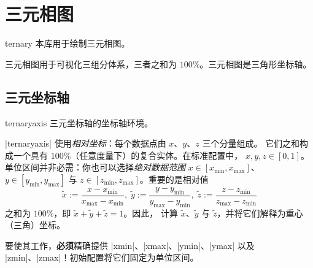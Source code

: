 
\section{三元相图}
\begingroup
\def\pgfplotsmanualcurlibrary{ternary}

\begin{pgfplotslibrary}{ternary}
    本库用于绘制三元相图。

    三元相图用于可视化三组分体系，三者之和为 $100\%$。三元相图是三角形坐标轴。
\end{pgfplotslibrary}


\subsection{三元坐标轴}

\begin{environment}{{ternaryaxis}}
    三元坐标轴的坐标轴环境。
\begin{codeexample}[]
\end{codeexample}

    |ternaryaxis| 使用\emph{相对坐标}：每个数据点由 $x$、$y$、$z$ 三个分量组成。
    它们之和构成一个具有 $100\%$（任意度量下）的复合实体。在标准配置中，
    $x,y,z \in [0,1]$。单位区间并非必需：你也可以选择\emph{绝对数据范围}
    $x \in [x_{\min},x_{\max}]$、$y \in [y_{\min},y_{\max}]$ 与
    $z \in [z_{\min},z_{\max}]$。重要的是相对值
        \[
            \tilde x := \frac{x-x_{\min}}{x_{\max} - x_{\min}},\;
            \tilde y := \frac{y-y_{\min}}{y_{\max} - y_{\min}},\;
            \tilde z := \frac{z-z_{\min}}{z_{\max} - z_{\min}}
        \]
    之和为 $100\%$，即 $\tilde x + \tilde y + \tilde z = 1$。因此，\PGFPlots{}
    计算 $\tilde x$、$\tilde y$ 与 $\tilde z$，并将它们解释为重心（三角）坐标。

    要使其工作，\textbf{必须}精确提供 |xmin|、|xmax|、|ymin|、|ymax| 以及
    |zmin|、|zmax|！初始配置将它们固定为单位区间。


\end{environment}
